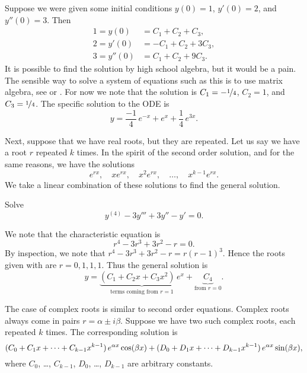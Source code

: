 \begin{example}
Suppose we were given some initial conditions $y(0) = 1$, $y'(0) = 2$,
and $y''(0) = 3$.  Then
\begin{equation*}
\begin{aligned}
1 = y(0) & = C_1 + C_2 + C_3 , \\
2 = y'(0) & = -C_1 + C_2 + 3C_3 , \\
3 = y''(0) & = C_1 + C_2 + 9C_3 .
\end{aligned}
\end{equation*}
It is possible to find the solution by high school algebra, but it would be a
pain.
The sensible way to solve a system of equations such as this is to use
matrix algebra, see
 or .
For now we note that the solution is $C_1 =
-\nicefrac{1}{4}$,
$C_2 = 1$, and $C_3 = \nicefrac{1}{4}$.  The specific solution
to the ODE is
\begin{equation*}
y = \frac{-1}{4}\, e^{-x} + e^x + \frac{1}{4}\, e^{3x} .
\end{equation*}
\end{example}

Next, suppose that we have real roots, but they are repeated.  Let us say
we have
a root $r$ repeated $k$ times.  In the spirit of the second
order solution, and for the same reasons, we have the solutions
\begin{equation*}
e^{rx}, \quad xe^{rx}, \quad x^2 e^{rx}, \quad \ldots, \quad x^{k-1} e^{rx} .
\end{equation*}
We take a linear combination of these solutions to find the general
solution.

\begin{example}
Solve
\begin{equation*}
y^{(4)} - 3 y''' + 3 y'' - y' =  0 .
\end{equation*}

We note that the characteristic equation is
\begin{equation*}
r^4 - 3r^3 + 3r^2 -r = 0 .
\end{equation*}
By inspection, we note that $r^4 - 3r^3 + 3r^2 -r = r{(r-1)}^3$.  Hence
the roots given with  are $r = 0, 1, 1, 1$.  Thus the general
solution is
\begin{equation*}
y = \underbrace{(C_1 + C_2 x + C_3 x^2)\, e^x}_{\text{terms coming from }
r=1} + \underbrace{C_4}_{\text{from } r=0} .
\end{equation*}
\end{example}

The case of complex roots is similar
to second order equations.
Complex roots
always come in pairs $r = \alpha \pm i \beta$.  Suppose we have
two such complex roots, each repeated $k$ times.
The corresponding solution is
\begin{equation*}
( C_0 + C_1 x + \cdots + C_{k-1} x^{k-1} ) \, e^{\alpha x} \cos (\beta x)
+
( D_0 + D_1 x + \cdots + D_{k-1} x^{k-1} ) \, e^{\alpha x} \sin (\beta x) ,
\avoidbreak
\end{equation*}
where $C_0$, \ldots, $C_{k-1}$, $D_0$, \ldots, $D_{k-1}$ are arbitrary
constants.


